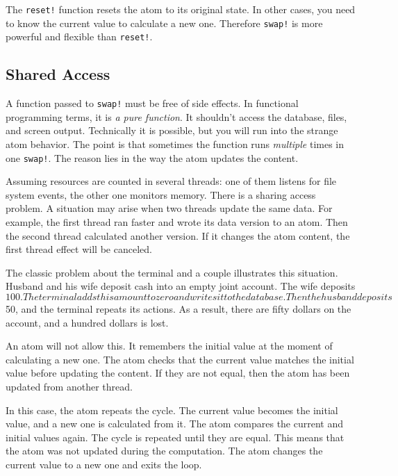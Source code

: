 \fi

The \verb|reset!| function resets the atom to its original state. In other cases, you need to know the current value to calculate a new one.
Therefore \verb|swap!| is more powerful and flexible than \verb|reset!|.

\subsection{Shared Access}


A function passed to \verb|swap!| must be free of side effects. In functional programming terms, it is \emph{a pure function}.
It shouldn't access the database, files, and screen output.
Technically it is possible, but you will run into the strange atom behavior.
The point is that sometimes the function runs \emph{multiple} times in one \verb|swap!|.
The reason lies in the way the atom updates the content.

Assuming resources are counted in several threads: one of them listens for file system events, the other one monitors memory.
There is a sharing access problem.
A situation may arise when two threads update the same data.
For example, the first thread ran faster and wrote its data version to an atom.
Then the second thread calculated another version.
If it changes the atom content, the first thread effect will be canceled.


The classic problem about the terminal and a couple illustrates this situation. Husband and his wife deposit cash into an empty joint account. The wife deposits $ 100. The terminal adds this amount to zero and writes it to the database. Then the husband deposits $ 50, and the terminal repeats its actions. As a result, there are fifty dollars on the account, and a hundred dollars is lost.

An atom will not allow this.
It remembers the initial value at the moment of calculating a new one.
The atom checks that the current value matches the initial value before updating the content.
If they are not equal, then the atom has been updated from another thread.

In this case, the atom repeats the cycle. The current value becomes the initial value, and a new one is calculated from it. The atom compares the current and initial values again.
The cycle is repeated until they are equal.
This means that the atom was not updated during the computation.
The atom changes the current value to a new one and exits the loop.

